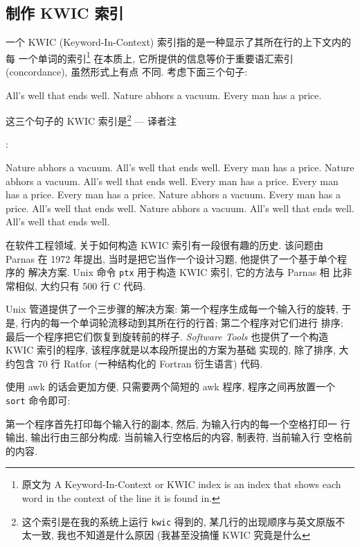 {\subsection{制作 KWIC 索引}
\label{subsec:making_a_kwic_index}

一个 KWIC (Keyword-In-Context) 索引指的是一种显示了其所在行的上下文内的每
一个单词的索引\footnote{原文为 A Keyword-In-Context or KWIC index is an
index that shows each word in the context of the line it is found in.}
在本质上, 它所提供的信息等价于重要语汇索引 (concordance), 虽然形式上有点
不同. 考虑下面三个句子:
\begin{file}
    All's well that ends well.
    Nature abhors a vacuum.
    Every man has a price.
\end{file}
这三个句子的 KWIC 索引是\footnote{这个索引是在我的系统上运行
    \texttt{kwic} 得到的, 某几行的出现顺序与英文原版不太一致,
我也不知道是什么原因 (我甚至没搞懂 KWIC 究竟是什么} --- 译者注}:
\begin{file}
                        Nature  abhors a vacuum.
                                All's well that ends well.
                 Every man has  a price.
                 Nature abhors  a vacuum.
               All's well that  ends well.
                                Every man has a price.
                     Every man  has a price.
                         Every  man has a price.
                                Nature abhors a vacuum.
               Every man has a  price.
                    All's well  that ends well.
               Nature abhors a  vacuum.
          All's well that ends  well.
                         All's  well that ends well.
\end{file}

在软件工程领域, 关于如何构造 KWIC 索引有一段很有趣的历史. 该问题由 Parnas 
在 1972 年提出, 当时是把它当作一个设计习题, 他提供了一个基于单个程序的
解决方案. Unix 命令 \texttt{ptx} 用于构造 KWIC 索引, 它的方法与 Parnas 相
比非常相似, 大约只有 500 行 C 代码.

Unix 管道提供了一个三步骤的解决方案: 第一个程序生成每一个输入行的旋转,
于是, 行内的每一个单词轮流移动到其所在行的行首; 第二个程序对它们进行
排序; 最后一个程序把它们恢复到旋转前的样子. \textit{Software Tools}
也提供了一个构造 KWIC 索引的程序, 该程序就是以本段所提出的方案为基础
实现的, 除了排序, 大约包含 70 行 Ratfor (一种结构化的 Fortran 衍生语言)
代码.

使用 awk 的话会更加方便, 只需要两个简短的 awk 程序, 程序之间再放置一个
\texttt{sort} 命令即可:
第一个程序首先打印每个输入行的副本, 然后, 为输入行内的每一个空格打印一
行输出, 输出行由三部分构成: 当前输入行空格后的内容, 制表符, 当前输入行%
%
空格前的内容.

